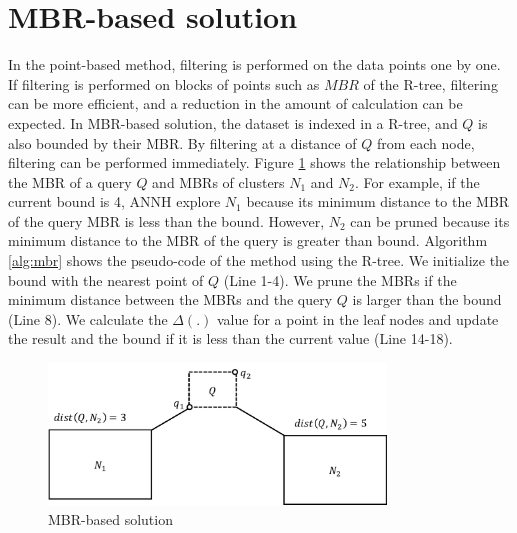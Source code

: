 \documentclass[a4paper,11pt]{report}
\theoremstyle{mytheoremstyle}
\begin{document}
\section{MBR-based solution}
In the point-based method, filtering is performed on the data points one by one. If filtering is performed on blocks of points such as $MBR$ of the R-tree, filtering can be more efficient, and a reduction in the amount of calculation can be expected. In MBR-based solution, the dataset is indexed in a R-tree, and $Q$ is also bounded by their MBR. By filtering at a distance of $Q$ from each node, filtering can be performed immediately. Figure \ref{fig:solution-mbr} shows the relationship between the MBR of a query $Q$ and MBRs of clusters $N_1$ and $N_2$. For example, if the current bound is 4, ANNH explore $N_1$ because its minimum distance to the MBR of the query MBR is less than the bound. However, $N_2$ can be pruned because its minimum distance to the MBR of the query is greater than bound. Algorithm \ref{alg:mbr} shows the pseudo-code of the method using the R-tree. We initialize the bound with the nearest point of $Q$ (Line 1-4). We prune the MBRs if the minimum distance between the MBRs and the query $Q$ is larger than the bound (Line 8). We calculate the $\Delta(.)$ value for a point in the leaf nodes and update the result and the bound if it is less than the current value (Line 14-18).

\begin{figure}
\begin{center}
    \includegraphics[width=0.8\textwidth]{images/solution-mbr.pdf}
\end{center}
\caption{MBR-based solution} \label{fig:solution-mbr}
\end{figure}
\end{document}
